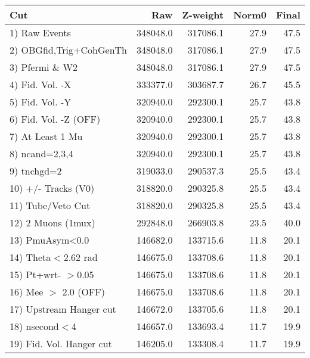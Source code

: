  \begin{table}[h!]\centering
 \begin{tabular}{||l||r|r|r|r||}
 \hline
 \hline
 Cut & Raw & Z-weight & Norm0 & Final \\
 \hline
  1) Raw Events           &    348048.0 &    317086.1 &        27.9 &        47.5 \\
  2) OBGfid,Trig+CohGenTh &    348048.0 &    317086.1 &        27.9 &        47.5 \\
  3) Pfermi \& W2         &    348048.0 &    317086.1 &        27.9 &        47.5 \\
  4) Fid. Vol. -X         &    333377.0 &    303687.7 &        26.7 &        45.5 \\
  5) Fid. Vol. -Y         &    320940.0 &    292300.1 &        25.7 &        43.8 \\
  6) Fid. Vol. -Z (OFF)   &    320940.0 &    292300.1 &        25.7 &        43.8 \\
  7) At Least 1 Mu        &    320940.0 &    292300.1 &        25.7 &        43.8 \\
  8) ncand=2,3,4          &    320940.0 &    292300.1 &        25.7 &        43.8 \\
  9) tnchgd=2             &    319033.0 &    290537.3 &        25.5 &        43.4 \\
 10) +/- Tracks (V0)      &    318820.0 &    290325.8 &        25.5 &        43.4 \\
 11) Tube/Veto Cut        &    318820.0 &    290325.8 &        25.5 &        43.4 \\
 12) 2 Muons (1mux)       &    292848.0 &    266903.8 &        23.5 &        40.0 \\
 13) PmuAsym<0.0          &    146682.0 &    133715.6 &        11.8 &        20.1 \\
 14) Theta$<$2.62 rad     &    146675.0 &    133708.6 &        11.8 &        20.1 \\
 15) Pt+wrt- $>$0.05      &    146675.0 &    133708.6 &        11.8 &        20.1 \\
 16) Mee $>$ 2.0  (OFF)   &    146675.0 &    133708.6 &        11.8 &        20.1 \\
 17) Upstream Hanger cut  &    146672.0 &    133705.6 &        11.8 &        20.1 \\
 18) nsecond$<$4          &    146657.0 &    133693.4 &        11.7 &        19.9 \\
 19) Fid. Vol. Hanger cut &    146205.0 &    133308.4 &        11.7 &        19.9 \\

\end{tabular}
\end{table}
